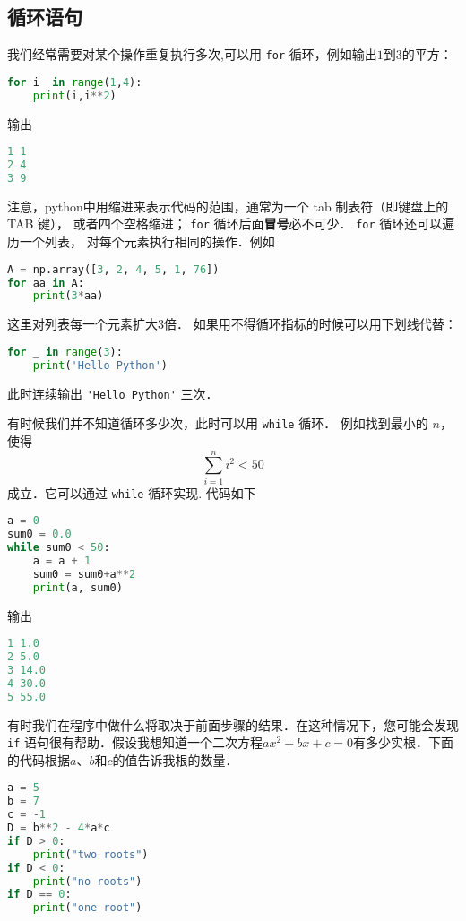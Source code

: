 

\subsection{循环语句}
我们经常需要对某个操作重复执行多次,可以用 \verb|for| 循环，例如输出$1$到$3$的平方：
\begin{lstlisting}[language=python]
for i  in range(1,4):
    print(i,i**2)
\end{lstlisting}
输出
\begin{lstlisting}[language=python]
1 1
2 4
3 9
\end{lstlisting}
注意，python中用缩进来表示代码的范围，通常为一个 tab 制表符（即键盘上的 TAB 键）， 或者四个空格缩进； \verb|for| 循环后面\textbf{冒号}必不可少． \verb|for| 循环还可以遍历一个列表， 对每个元素执行相同的操作．例如
\begin{lstlisting}[language=python]
A = np.array([3, 2, 4, 5, 1, 76])
for aa in A:
    print(3*aa)
\end{lstlisting}
这里对列表每一个元素扩大3倍． 如果用不得循环指标的时候可以用下划线代替：
\begin{lstlisting}[language=python]
for _ in range(3):
    print('Hello Python')
\end{lstlisting}
此时连续输出   \verb|'Hello Python'|  三次．

有时候我们并不知道循环多少次，此时可以用 \verb|while| 循环． 例如找到最小的 $n$，使得
\begin{equation}
\sum_{i=1}^n i^2<50
\end{equation}
成立．它可以通过 \verb|while| 循环实现. 代码如下
\begin{lstlisting}[language=python]
a = 0
sum0 = 0.0
while sum0 < 50:
    a = a + 1
    sum0 = sum0+a**2
    print(a, sum0)
\end{lstlisting}
输出
\begin{lstlisting}[language=python]
1 1.0
2 5.0
3 14.0
4 30.0
5 55.0
\end{lstlisting}

有时我们在程序中做什么将取决于前面步骤的结果．在这种情况下，您可能会发现 \verb|if| 语句很有帮助．假设我想知道一个二次方程$ax^2+bx+c=0$有多少实根．下面的代码根据$a$、$b$和$c$的值告诉我根的数量．
\begin{lstlisting}[language=python]
a = 5
b = 7
c = -1 
D = b**2 - 4*a*c
if D > 0:
    print("two roots")
if D < 0:
    print("no roots")
if D == 0:
    print("one root")
\end{lstlisting}

